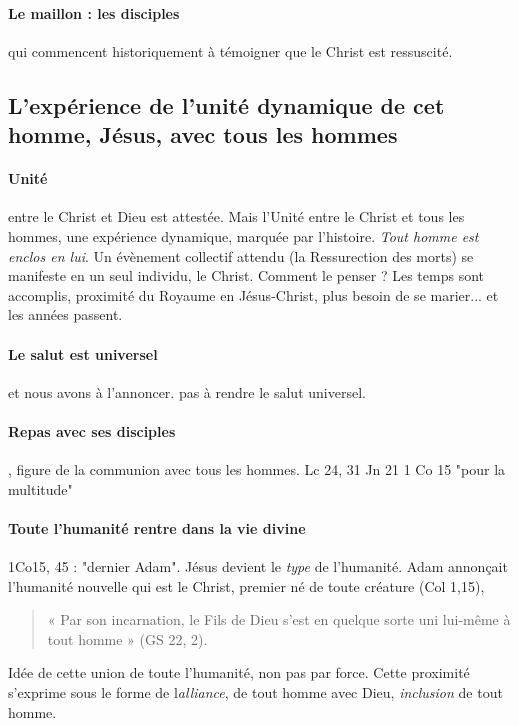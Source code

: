 \paragraph{Le maillon : les disciples} qui commencent historiquement à témoigner que le Christ est ressuscité. 


\subsection{L'expérience de l'unité dynamique de cet homme, Jésus, avec
    tous les hommes}
    

\paragraph{Unité} entre le Christ et Dieu est attestée. Mais l'Unité entre le Christ et tous les hommes, une expérience dynamique, marquée par l'histoire. \textit{Tout homme est enclos en lui}. Un évènement collectif attendu (la Ressurection des morts) se manifeste en un seul individu, le Christ. Comment le penser ? Les temps sont accomplis, proximité du Royaume en Jésus-Christ, plus besoin de se marier... et les années passent. 

\paragraph{Le salut est universel} et nous avons à l'annoncer. pas à rendre le salut universel. 

\paragraph{Repas avec ses disciples}, figure de la communion avec tous les hommes. 
Lc 24, 31
Jn 21
1 Co 15 "pour la multitude"

\paragraph{Toute l'humanité rentre dans la vie divine} 1Co15, 45 : "dernier Adam". Jésus devient le \textit{type } de l'humanité. Adam annonçait l'humanité nouvelle qui est le Christ, premier né de toute créature (Col 1,15),  
  
 \begin{quote}
     «  Par  son  incarnation,  le  Fils  de  Dieu  s’est  en  quelque  sorte  uni  lui-même  à  tout  homme  »  (GS 22, 2). 
 \end{quote}
 
 Idée de cette union de toute l'humanité, non pas par force. Cette proximité s'exprime sous le forme de l\textit{alliance}, de tout homme avec Dieu, \textit{inclusion } de tout homme.
    
